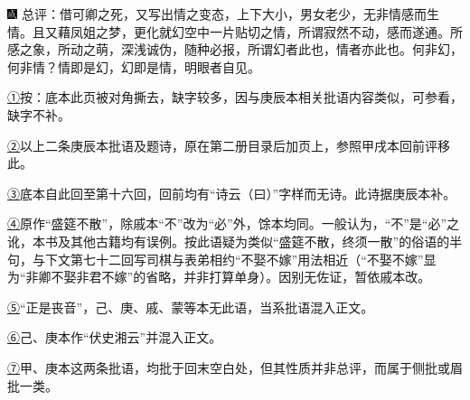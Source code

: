 {\includegraphics[width=3mm]{../Images/00005}  \kaishu 总评：借可卿之死，又写出情之变态，上下大小，男女老少，无非情感而生情。且又藉凤姐之梦，更化就幻空中一片贴切之情，所谓寂然不动，感而遂通。所感之象，所动之萌，深浅诚伪，随种必报，所谓幻者此也，情者亦此也。何非幻，何非情？情即是幻，幻即是情，明眼者自见。}



{\href{../Text/part0017_split_000.html\#navto_1_a}{①}按：底本此页被对角撕去，缺字较多，因与庚辰本相关批语内容类似，可参看，缺字不补。}

{\href{../Text/part0017_split_000.html\#navto_2_a}{②}以上二条庚辰本批语及题诗，原在第二册目录后加页上，参照甲戌本回前评移此。}

{\href{../Text/part0017_split_000.html\#navto_3_a}{③}底本自此回至第十六回，回前均有``诗云（曰）''字样而无诗。此诗据庚辰本补。}

{\href{../Text/part0017_split_000.html\#navto_4_a}{④}原作``盛筵不散''，除戚本``不''改为``必''外，馀本均同。一般认为，``不''是``必''之讹，本书及其他古籍均有误例。按此语疑为类似``盛筵不散，终须一散''的俗语的半句，与下文第七十二回写司棋与表弟相约``不娶不嫁''用法相近（``不娶不嫁''显为``非卿不娶非君不嫁''的省略，并非打算单身）。因别无佐证，暂依戚本改。}

{\href{../Text/part0017_split_000.html\#navto_5_a}{⑤}``正是丧音''，己、庚、戚、蒙等本无此语，当系批语混入正文。}

{\href{../Text/part0017_split_000.html\#navto_6_a}{⑥}己、庚本作``伏史湘云''并混入正文。}

{\href{../Text/part0017_split_000.html\#navto_7_a}{⑦}甲、庚本这两条批语，均批于回末空白处，但其性质并非总评，而属于侧批或眉批一类。}
